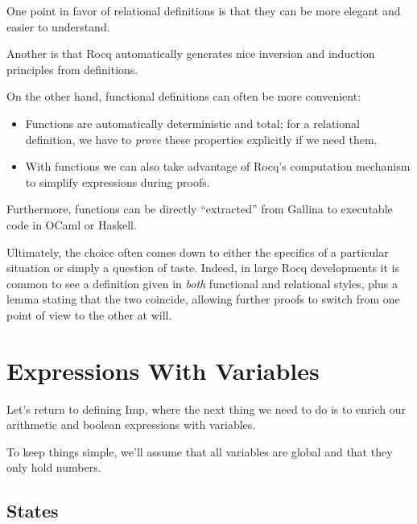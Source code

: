 \documentclass[12pt]{report}
\begin{document}
    One point in favor of relational definitions is that they can be
    more elegant and easier to understand.


    Another is that Rocq automatically generates nice inversion and
    induction principles from  definitions.


    On the other hand, functional definitions can often be more
    convenient:

\begin{itemize}
\item  Functions are automatically deterministic and total; for a
       relational definition, we have to \textit{prove} these properties
       explicitly if we need them.

\item  With functions we can also take advantage of Rocq's computation
       mechanism to simplify expressions during proofs.

\end{itemize}


    Furthermore, functions can be directly ``extracted'' from Gallina to
    executable code in OCaml or Haskell.


    Ultimately, the choice often comes down to either the specifics of
    a particular situation or simply a question of taste.  Indeed, in
    large Rocq developments it is common to see a definition given in
    \textit{both} functional and relational styles, plus a lemma stating that
    the two coincide, allowing further proofs to switch from one point
    of view to the other at will. 
\begin{coqdoccode}
\coqdocemptyline
\end{coqdoccode}
\section{Expressions With Variables}



 Let's return to defining Imp, where the next thing we need to do
    is to enrich our arithmetic and boolean expressions with
    variables.


    To keep things simple, we'll assume that all variables are global
    and that they only hold numbers. 
\begin{coqdoccode}
\coqdocemptyline
\end{coqdoccode}
\subsection{States}
\end{document}
